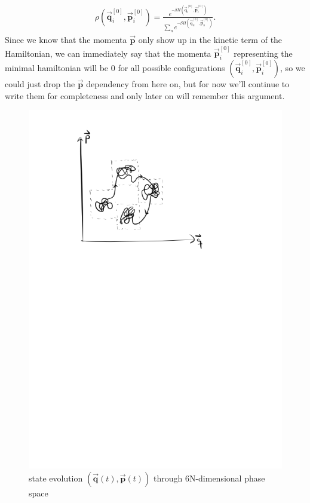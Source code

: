 \begin{align}
	\rho(\vec{\mathbf{q}}_{i}^{[0]},\vec{\mathbf{p}}_{i}^{[0]})=\frac{e^{-\beta H(\vec{\mathbf{q}}_{i}^{[0]},\vec{\mathbf{p}}_{i}^{[0]})}}{\sum_{n} e^{-\beta H(\vec{\mathbf{q}}_{n}^{[0]},\vec{\mathbf{p}}_{n}^{[0]})}}.
\end{align}
Since we know that the momenta $\vec{\mathbf{p}}$ only show up in the kinetic term of the Hamiltonian, we can immediately say that the momenta $\vec{\mathbf{p}}_{i}^{[0]}$ representing the minimal hamiltonian will be 0 for all possible configurations $(\vec{\mathbf{q}}_{i}^{[0]},\vec{\mathbf{p}}_{i}^{[0]})$, so we could just drop the $\vec{\mathbf{p}}$ dependency from here on, but for now we'll continue to write them for completeness and only later on will remember this argument.

\begin{figure}
	\centering
	\includegraphics[trim=3cm 18cm 6cm 1.5cm, clip,scale=0.7]{./Inhalt/Bilder/phasespace.png}
	\caption{state evolution $(\vec{\mathbf{q}}(t),\vec{\mathbf{p}}(t))$ through 6N-dimensional phase space}
	\label{fig:phasepsace}
\end{figure}
